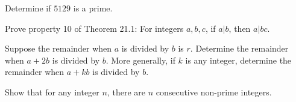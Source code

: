\begin{prob}
Determine if $5129$ is a prime.
\end{prob}

\begin{prob}
Prove property 10 of Theorem 21.1: For integers $a,b,c$, if $a|b$, then $a|bc$.
\end{prob}

\begin{prob}
Suppose the remainder when $a$ is divided by $b$ is $r$. Determine the remainder when $a+2b$ is divided by $b$. More generally, if $k$ is any integer, determine the remainder when $a+kb$ is divided by $b$.
\end{prob}

\begin{prob}
Show that for any integer $n$, there are $n$ consecutive non-prime integers.
\end{prob}

